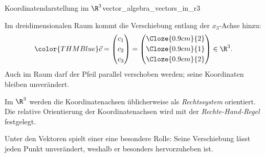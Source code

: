 \begin{ExampleBox}{Koordinatendarstellung im $\R^3$}{vector_algebra_vectors_in_r3}
  \noindent
  \begin{minipage}[c]{0.40\linewidth}
    Im dreidimensionalen Raum kommt die Verschiebung entlang der
    $x_3$-Achse hinzu:
    \[
      {\color{THMBlue}
        \vec c=
        \begin{pmatrix}
          c_1\\[0.25em]c_2\\[0.25em]c_3
        \end{pmatrix}
        =
        \begin{pmatrix}
          \Cloze{0.9cm}{2}\\[0.25em]
          \Cloze{0.9cm}{1}\\[0.25em]
          \Cloze{0.9cm}{2}
        \end{pmatrix}}
      \in\R^3.
    \]
    Auch im Raum darf der Pfeil parallel verschoben werden; seine
    Koordinaten bleiben unverändert.
  \end{minipage}\hfill
  \begin{minipage}[c]{0.56\linewidth}
    \centering
  \end{minipage}
\end{ExampleBox}

\begin{RemarkBox}[remark title=Rechtssystem]
  \label{rem:vector_algebra_right_handed_system}
  Im $\R^3$ werden die Koordinatenachsen üblicherweise als
  \emph{Rechtssystem} 
  orientiert. Die relative Orientierung der Koordinatenachsen wird mit der
  \emph{Rechte-Hand-Regel}  festgelegt.
  \par\smallskip
  \noindent
  \begin{minipage}[c]{0.44\linewidth}
    \centering
  \end{minipage}\hfill
  \begin{minipage}[c]{0.50\linewidth}
    \centering
  \end{minipage}
\end{RemarkBox}

Unter den Vektoren spielt einer eine besondere Rolle: Seine Verschiebung lässt
jeden Punkt unverändert, weshalb er besonders hervorzuheben ist.

